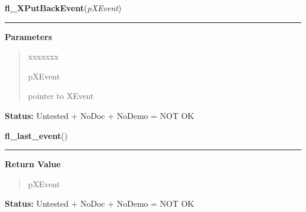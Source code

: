     \label{xformslib:library:fl_XPutBackEvent}

    \vspace{0.5ex}

\hspace{.8\funcindent}\begin{boxedminipage}{\funcwidth}

    \raggedright \textbf{fl\_XPutBackEvent}(\textit{pXEvent})

    \vspace{-1.5ex}

    \rule{\textwidth}{0.5\fboxrule}
\setlength{\parskip}{2ex}
\setlength{\parskip}{1ex}
      \textbf{Parameters}
      \vspace{-1ex}

      \begin{quote}
        \begin{Ventry}{xxxxxxx}

          \item[pXEvent]

          pointer to XEvent

        \end{Ventry}

      \end{quote}

\textbf{Status:} Untested + NoDoc + NoDemo = NOT OK



    \end{boxedminipage}

    \label{xformslib:library:fl_last_event}

    \vspace{0.5ex}

\hspace{.8\funcindent}\begin{boxedminipage}{\funcwidth}

    \raggedright \textbf{fl\_last\_event}()

    \vspace{-1.5ex}

    \rule{\textwidth}{0.5\fboxrule}
\setlength{\parskip}{2ex}
\setlength{\parskip}{1ex}
      \textbf{Return Value}
    \vspace{-1ex}

      \begin{quote}
      pXEvent

      \end{quote}

\textbf{Status:} Untested + NoDoc + NoDemo = NOT OK



    \end{boxedminipage}

